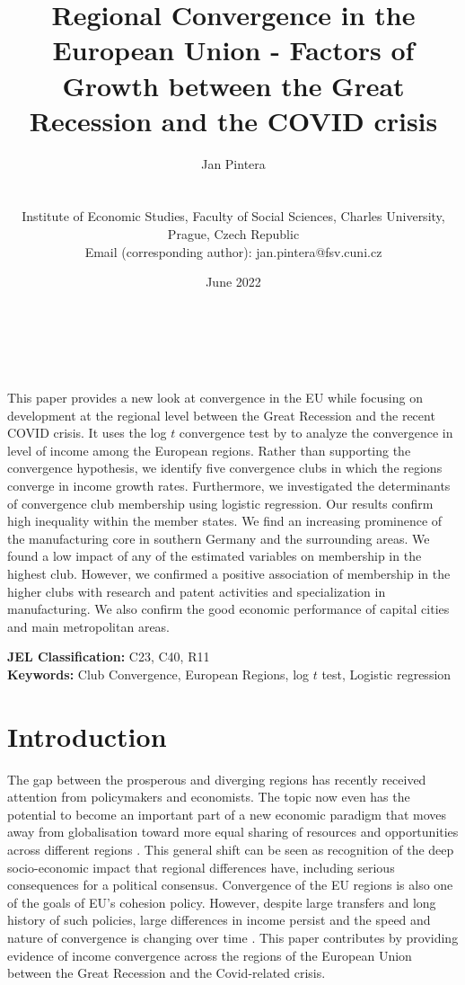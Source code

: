 \documentclass[11pt]{article}
\title{Regional Convergence in the European Union - Factors of Growth between the Great Recession and the COVID crisis}
\author{
        \begin{large}Jan Pintera\end{large} \\\vspace{5mm} \begin{small} Institute of Economic Studies, Faculty of Social Sciences, Charles University,\\ Prague, Czech Republic\\
        Email (corresponding author): jan.pintera@fsv.cuni.cz \end{small}
}
\date{June 2022}
\makeatletter
\renewcommand{\maketitle}{\bgroup\setlength{\parindent}{0pt}
\begin{flushright}
  \textbf{\@title}\\
  \vspace{5mm}
  \@author\\
  \vspace{5mm}
  \@date
\end{flushright}\egroup
}
\renewenvironment{abstract}
 {\small
  \begin{flushleft}
  \bfseries \abstractname\vspace{-.5em}\vspace{0pt}
  \end{flushleft}
  \list{}{%
    \setlength{\leftmargin}{0mm}%
    \setlength{\rightmargin}{\leftmargin}%
  }%
  \item\relax}
 {\endlist}
\def \Keywords {Club Convergence, European Regions, log $t$ test, Logistic regression}
\makeatother
\begin{document}
\maketitle


\thispagestyle{empty}
\begin{abstract}
This paper provides a new look at convergence in the EU while focusing on development at the regional level between the Great Recession and the recent COVID crisis. It uses the log $t$ convergence test by \citet{phillips2007transition} to analyze the convergence in level of income among the European regions. Rather than supporting the convergence hypothesis, we identify five convergence clubs in which the regions converge in income growth rates. Furthermore, we investigated the determinants of convergence club membership using logistic regression. Our results confirm high inequality within the member states. We find an increasing prominence of the manufacturing core in southern Germany and the surrounding areas. We found a low impact of any of the estimated variables on membership in the highest club. However, we confirmed a positive association of membership in the higher clubs with research and patent activities and specialization in manufacturing. We also confirm the good economic performance of capital cities and main metropolitan areas.

\bigskip


\textbf{JEL Classification:} C23, C40, R11 \\
\textbf{Keywords:}  \Keywords \\


\end{abstract}
\clearpage
\setcounter{page}{1}

\section{Introduction}
The gap between the prosperous and diverging regions has recently received attention from policymakers and economists. The topic now even has the potential to become an important part of a new economic paradigm that moves away from globalisation toward more equal sharing of resources and opportunities across different regions \citep{rodrik_2022}. This general shift can be seen as recognition of the deep socio-economic impact that regional differences have, including serious consequences for a political consensus. Convergence of the EU regions is also one of the goals of EU's cohesion policy. However, despite large transfers and long history of such policies, large differences in income persist and the speed and nature of convergence is changing over time \citep{eckey2007convergence,zarotiadis2013european, iammarino2019regional}.
This paper contributes by providing evidence of income convergence across the regions of the European Union between the Great Recession and the Covid-related crisis.
\end{document}
